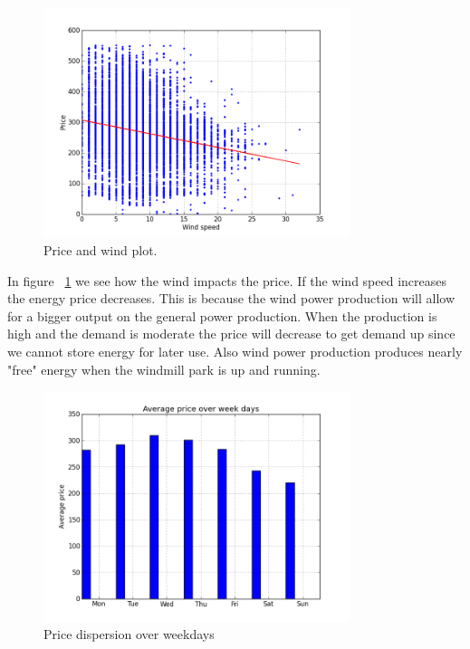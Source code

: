 \begin{figure}[H]
\centering
\includegraphics[width=0.8\textwidth ,natwidth=410,natheight=237]{billeder/energy_price_plots/price_wind.png}
\caption{Price and wind plot.}
\label{fig:price_wind}
\end{figure}

In figure ~\ref{fig:price_wind} we see how the wind impacts the price. If the wind speed increases the energy price decreases. This is because the wind power production will allow for a bigger output on the general power production. When the production is high and the demand is moderate the price will decrease to get demand up since we cannot store energy for later use. Also wind power production produces nearly "free" energy when the windmill park is up and running.

\begin{figure}[H]
\centering
\includegraphics[width=0.8\textwidth ,natwidth=410,natheight=237]{billeder/energy_price_plots/Average_price_over_weekdays.png}
\caption{Price dispersion over weekdays}
\label{fig:price_over_weekdays}
\end{figure}

